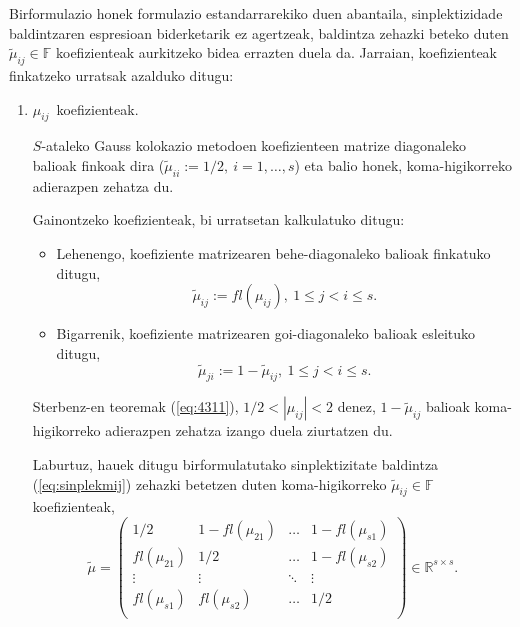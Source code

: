 Birformulazio honek formulazio estandarrarekiko duen abantaila,  sinplektizidade baldintzaren espresioan biderketarik ez agertzeak, baldintza zehazki beteko duten $\tilde \mu_{ij} \in \mathbb{F}$ koefizienteak aurkitzeko bidea errazten duela da. Jarraian, koefizienteak finkatzeko urratsak azalduko ditugu:
\begin{enumerate}
\item $\mu_{ij}$~koefizienteak.

$S$-ataleko Gauss kolokazio metodoen koefizienteen matrize diagonaleko balioak finkoak dira ($\tilde{\mu}_{ii}:=1/2, \ i=1,\dots,s$) eta balio honek, koma-higikorreko adierazpen zehatza du.

Gainontzeko koefizienteak, bi urratsetan kalkulatuko ditugu:
\begin{itemize}
\item Lehenengo, koefiziente matrizearen behe-diagonaleko balioak finkatuko ditugu,
\begin{equation*}
 \tilde{\mu}_{ij}:=fl(\mu_{ij}), \ 1 \leqslant j < i \leqslant s.
\end{equation*}

\item Bigarrenik, koefiziente matrizearen goi-diagonaleko balioak esleituko ditugu,
\begin{equation*}
\tilde{\mu}_{ji}:=1-\tilde{\mu}_{ij} , \ 1 \leqslant j < i \leqslant s.
\end{equation*}

\end{itemize}
Sterbenz-en teoremak (\ref{eq:4311}), $1/2 < |\mu_{ij}| <2$ denez, $1-\tilde{\mu}_{ij}$ balioak koma-higikorreko adierazpen zehatza izango duela ziurtatzen du. 

Laburtuz, hauek ditugu birformulatutako sinplektizitate baldintza (\ref{eq:sinplekmij}) zehazki betetzen duten koma-higikorreko $\tilde{\mu}_{ij}\in \mathbb{F}$ koefizienteak,   
\begin{equation}
\tilde{\mu}=\left(\begin{array}{cccc}
    1/2       & 1-fl(\mu_{21}) & \dots & 1-fl(\mu_{s1})      \\
    fl(\mu_{21})      & 1/2    & \dots & 1-fl(\mu_{s2})      \\
    \vdots            & \vdots         & \ddots      & \vdots      \\
    fl(\mu_{s1})      & fl(\mu_{s2})   & \dots & 1/2          \\ 
     \end{array}\right) \in \mathbb{R}^{s \times s}.
\end{equation}


\end{enumerate}
